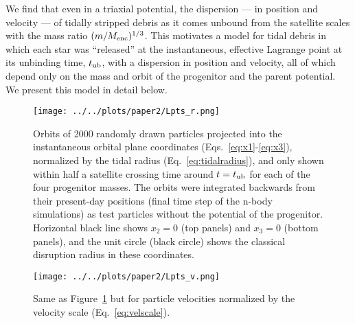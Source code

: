 \documentclass[letterpaper,12pt,preprint]{aastex}
\newcommand{\tub}{t_{\rm ub}}
\begin{document}
We find that even in a triaxial potential, the dispersion --- in position and velocity --- of tidally stripped debris as it comes unbound from the satellite scales with the mass ratio $(m / M_{\rm enc})^{1/3}$. This motivates a model for tidal debris in which each star was ``released'' at the instantaneous, effective Lagrange point at its unbinding time, $\tub$, with a dispersion in position and velocity, all of which depend only on the mass and orbit of the progenitor and the parent potential. We present this model in detail below.

\begin{figure}[h]
\begin{center}
\texttt{[image: ../../plots/paper2/Lpts\_r.png]}
\caption{ Orbits of 2000 randomly drawn particles projected into the instantaneous orbital plane coordinates (Eqs.~\ref{eq:x1}-\ref{eq:x3}), normalized by the tidal radius (Eq.~\ref{eq:tidalradius}), and only shown within half a satellite crossing time around $t=\tub$ for each of the four progenitor masses. The orbits were integrated backwards from their present-day positions (final time step of the n-body simulations) as test particles without the potential of the progenitor. Horizontal black line shows $x_2=0$ (top panels) and $x_3=0$ (bottom panels), and the unit circle (black circle) shows the classical disruption radius in these coordinates. }\label{fig:lpts_r}
\end{center}
\end{figure}

\begin{figure}[h]
\begin{center}
\texttt{[image: ../../plots/paper2/Lpts\_v.png]}
\caption{ Same as Figure~\ref{fig:lpts_r} but for particle velocities normalized by the velocity scale (Eq.~\ref{eq:velscale}). }\label{fig:lpts_v}
\end{center}
\end{figure}

\end{document}

